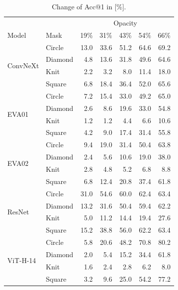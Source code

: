 \documentclass[a4paper, oneside]{discothesis}
\begin{document}
\begin{table}[h]

    \setlength{\tabcolsep}{2pt}
    \tiny
    \centering
    \begin{minipage}{0.48\textwidth}
        \centering

        \begin{tabular}{ll|rrrrr}
			\multicolumn{2}{c|}{} & \multicolumn{5}{c}{Opacity} \\
			Model & Mask &  19\% & 31\% & 43\% & 54\% & 66\% \\
			\midrule
			\multirow{4}{*}{ConvNeXt} & Circle & 13.0  & 33.6  & 51.2  & 64.6  & 69.2  \\
			& Diamond & 4.8  & 13.6  & 31.8  & 49.6  & 64.6  \\
			& Knit & 2.2  & 3.2  & 8.0  & 11.4  & 18.0  \\
			& Square & 6.8  & 18.4  & 36.4  & 52.0  & 65.6 \\\midrule
			\multirow{4}{*}{EVA01} & Circle & 7.2  & 15.4  & 33.0  & 49.2  & 65.0  \\
			& Diamond & 2.6  & 8.6  & 19.6  & 33.0  & 54.8  \\
			& Knit & 1.2  & 1.2  & 4.4  & 6.6  & 10.6  \\
			& Square & 4.2  & 9.0  & 17.4  & 31.4  & 55.8 \\\midrule
			\multirow{4}{*}{EVA02} & Circle & 9.4  & 19.0  & 31.4  & 50.4  & 63.8  \\
			& Diamond & 2.4  & 5.6  & 10.6  & 19.0  & 38.0  \\
			& Knit & 2.8  & 4.8  & 5.2  & 6.8  & 8.8  \\
			& Square & 6.8  & 12.4  & 20.8  & 37.4  & 61.8 \\\midrule
			\multirow{4}{*}{ResNet} & Circle & 31.0  & 54.6  & 60.0  & 62.4  & 63.4  \\
			& Diamond & 13.2  & 31.6  & 50.4  & 59.4  & 62.2  \\
			& Knit & 5.0  & 11.2  & 14.4  & 19.4  & 27.6  \\
			& Square & 15.2  & 38.8  & 56.0  & 62.2  & 63.4 \\\midrule
			\multirow{4}{*}{ViT-H-14} & Circle & 5.8  & 20.6  & 48.2  & 70.8  & 80.2  \\
			& Diamond & 2.0  & 5.4  & 15.2  & 34.4  & 61.8  \\
			& Knit & 1.6 & 2.4  & 2.8  & 6.2  & 8.0  \\
			& Square & 3.2  & 9.6  & 25.0  & 54.2  & 77.2  \\
        \end{tabular}
        \vspace*{0.1cm}
        \caption{Change of Acc@1 in [\%].}
        \label{tab:drop-acc1}
        

\end{minipage}
\end{table}
\end{document}
